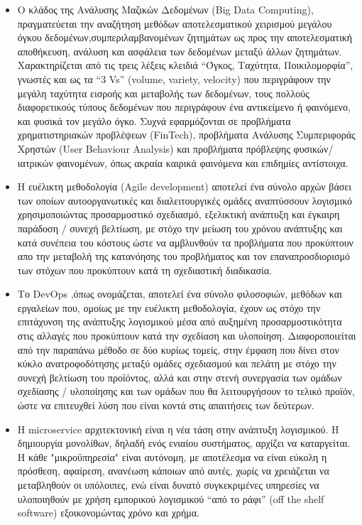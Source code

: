 \documentclass{article}
\begin{document}
\begin{itemize}
\item Ο κλάδος της Ανάλυσης Μαζικών Δεδομένων (Big Data Computing), πραγματεύεται την αναζήτηση μεθόδων αποτελεσματικού χειρισμού μεγάλου όγκου δεδομένων,συμπεριλαμβανομένων ζητημάτων ως προς την αποτελεσματική αποθήκευση, ανάλυση και ασφάλεια των δεδομένων μεταξύ άλλων ζητημάτων. Χαρακτηρίζεται από τις τρεις λέξεις κλειδιά “Όγκος, Ταχύτητα, Ποικιλομορφία”, γνωστές και ως τα “3 Vs” (volume, variety, velocity) που περιγράφουν την μεγάλη ταχύτητα εισροής και μεταβολής των δεδομένων, τους πολλούς διαφορετικούς τύπους δεδομένων που περιγράφουν ένα αντικείμενο ή φαινόμενο, και φυσικά τον μεγάλο όγκο. Συχνά εφαρμόζονται σε προβλήματα χρηματιστηριακών προβλέψεων (FinTech), προβλήματα Ανάλυσης Συμπεριφοράς Χρηστών (User Behaviour Analysis) και προβλήματα πρόβλεψης φυσικών/ιατρικών φαινομένων, όπως ακραία καιρικά φαινόμενα και επιδημίες αντίστοιχα.
\item Η ευέλικτη μεθοδολογία (Agile development) αποτελεί ένα σύνολο αρχών βάσει των οποίων αυτοοργανωτικές και διαλειτουργικές ομάδες αναπτύσσουν λογισμικό χρησιμοποιώντας προσαρμοστικό σχεδιασμό, εξελικτική ανάπτυξη και έγκαιρη παράδοση / συνεχή βελτίωση, με στόχο την μείωση του χρόνου ανάπτυξης και κατά συνέπεια του κόστους ώστε να αμβλυνθούν τα προβλήματα που προκύπτουν απο την μεταβολή της κατανόησης του προβλήματος και τον επαναπροσδιορισμό των στόχων που προκύπτουν κατά τη σχεδιαστική διαδικασία.
\item Το DevOps ,όπως ονομάζεται, αποτελεί ένα σύνολο φιλοσοφιών, μεθόδων και εργαλείων που, ομοίως με την ευέλικτη μεθοδολογία, έχουν ως στόχο την επιτάχυνση της ανάπτυξης λογισμικού μέσα από αυξημένη προσαρμοστικότητα στις αλλαγές που προκύπτουν κατά την σχεδίαση και υλοποίηση. Διαφοροποιείται από την παραπάνω μέθοδο σε δύο κυρίως τομείς, στην έμφαση που δίνει στον κύκλο ανατροφοδότησης μεταξύ ομάδες σχεδιασμού και πελάτη με στόχο την συνεχή βελτίωση του προϊόντος, αλλά και στην στενή συνεργασία των ομάδων σχεδίασης / υλοποίησης και των ομάδων που θα λειτουργήσουν το τελικό προϊόν, ώστε να επιτευχθεί λύση που είναι κοντά στις απαιτήσεις των δεύτερων.
\item Η microservice αρχιτεκτονική είναι η νέα τάση στην ανάπτυξη λογισμικού. Η δημιουργία μονολίθων, δηλαδή ενός ενιαίου συστήματος, αρχίζει να καταργείται. Η κάθε "μικροϋπηρεσία" είναι αυτόνομη, με αποτέλεσμα να είναι εύκολη η πρόσθεση, αφαίρεση, ανανέωση κάποιων από αυτές, χωρίς να χρειάζεται να μεταβληθούν οι υπόλοιπες, ενώ είναι δυνατό συγκεκριμένες υπηρεσίες να υλοποιηθούν με χρήση εμπορικού λογισμικού “από το ράφι” (off the shelf software) εξοικονομώντας χρόνο και χρήμα.

\end{itemize}
\end{document}
